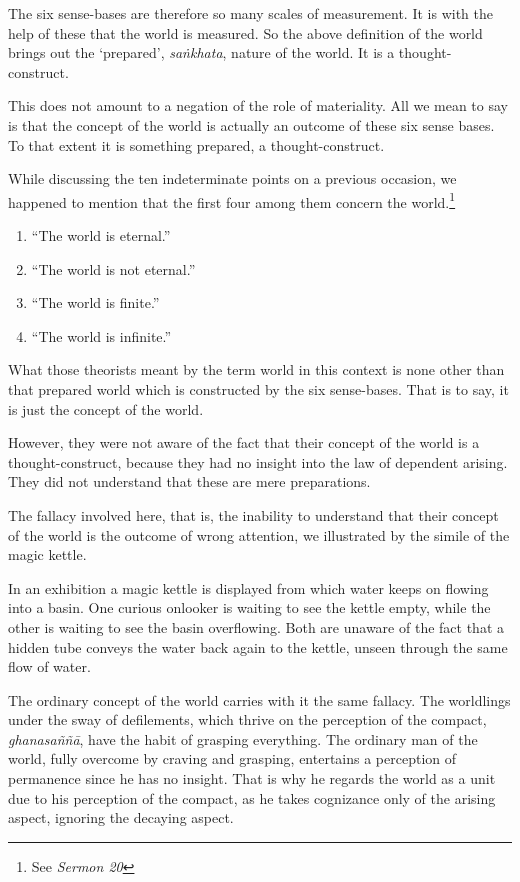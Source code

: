 The six sense-bases are therefore so many scales of measurement. It is with the help of these that the world is measured. So the above definition of the world brings out the `prepared', \emph{saṅkhata}, nature of the world. It is a thought-construct.

This does not amount to a negation of the role of materiality. All we mean to say is that the concept of the world is actually an outcome of these six sense bases. To that extent it is something prepared, a thought-construct.

While discussing the ten indeterminate points on a previous occasion, we happened to mention that the first four among them concern the world.\footnote{See \emph{Sermon 20}}

\begin{enumerate}
\def\labelenumi{\arabic{enumi}.}
\tightlist
\item
  ``The world is eternal.''
\item
  ``The world is not eternal.''
\item
  ``The world is finite.''
\item
  ``The world is infinite.''
\end{enumerate}

What those theorists meant by the term world in this context is none other than that prepared world which is constructed by the six sense-bases. That is to say, it is just the concept of the world.

However, they were not aware of the fact that their concept of the world is a thought-construct, because they had no insight into the law of dependent arising. They did not understand that these are mere preparations.

The fallacy involved here, that is, the inability to understand that their concept of the world is the outcome of wrong attention, we illustrated by the simile of the magic kettle.

In an exhibition a magic kettle is displayed from which water keeps on flowing into a basin. One curious onlooker is waiting to see the kettle empty, while the other is waiting to see the basin overflowing. Both are unaware of the fact that a hidden tube conveys the water back again to the kettle, unseen through the same flow of water.

The ordinary concept of the world carries with it the same fallacy. The worldlings under the sway of defilements, which thrive on the perception of the compact, \emph{ghanasaññā}, have the habit of grasping everything. The ordinary man of the world, fully overcome by craving and grasping, entertains a perception of permanence since he has no insight. That is why he regards the world as a unit due to his perception of the compact, as he takes cognizance only of the arising aspect, ignoring the decaying aspect.

